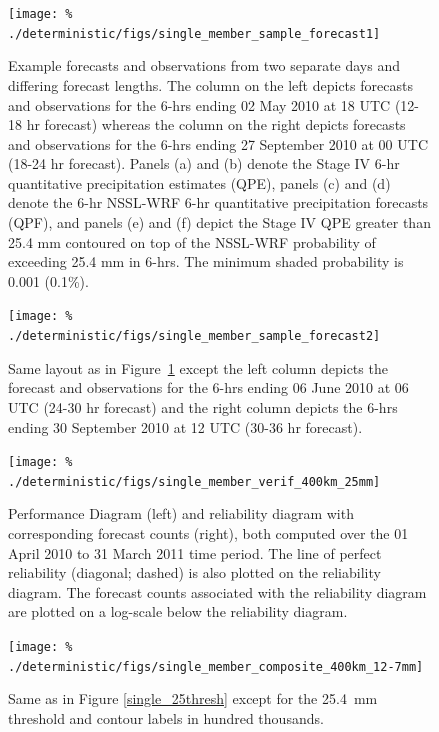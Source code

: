 \clearpage
\begin{figure}[cc]
    \centering
    \texttt{[image: \%
    ./deterministic/figs/single\_member\_sample\_forecast1]}\\
    \caption{Example forecasts and observations from two separate days and differing forecast lengths.
    The column on the left depicts forecasts and observations for the 6-hrs ending 02 May 2010 at 18 UTC (12-18 hr forecast) whereas the column on the right depicts forecasts and observations for the 6-hrs ending 27 September 2010 at 00 UTC (18-24 hr forecast).
    Panels (a) and (b) denote the Stage IV 6-hr quantitative precipitation estimates (QPE), panels (c) and (d) denote the 6-hr NSSL-WRF 6-hr quantitative precipitation forecasts (QPF), and panels (e) and (f) depict the Stage IV QPE greater than 25.4 mm contoured on top of the NSSL-WRF probability of exceeding 25.4 mm in 6-hrs. The minimum shaded probability is 0.001 (0.1\%).}
    \label{single_sample1}
\end{figure}


\clearpage
\begin{figure}[cc]
    \centering
    \texttt{[image: \%
    ./deterministic/figs/single\_member\_sample\_forecast2]}\\
    \caption{Same layout as in \mbox{Figure \ref{single_sample1}} except the left column depicts the forecast and observations for the 6-hrs ending 06 June 2010 at 06 UTC (24-30 hr forecast) and the right column depicts the 6-hrs ending 30 September 2010 at 12 UTC (30-36 hr forecast).}
    \label{single_sample2}
\end{figure}


\clearpage
\begin{figure}[cc]
    \centering
    \texttt{[image: \%
    ./deterministic/figs/single\_member\_verif\_400km\_25mm]}\\
    \caption{Performance Diagram (left) and reliability diagram with corresponding forecast counts (right), both computed over the 01 April 2010 to 31 March 2011 time period.
    The line of perfect reliability (diagonal; dashed) is also plotted on the reliability diagram.
    The forecast counts associated with the reliability diagram are plotted on a log-scale below the reliability diagram.}
    \label{single_verif_400km_25mm}
\end{figure}


\clearpage
\begin{figure}[cc]
    \centering
    \texttt{[image: \%
    ./deterministic/figs/single\_member\_composite\_400km\_12-7mm]}\\
    \caption{Same as in Figure \ref{single_25thresh} except for the \mbox{25.4 mm} threshold and contour labels in hundred thousands.}

    \label{single_12thresh}
\end{figure}



